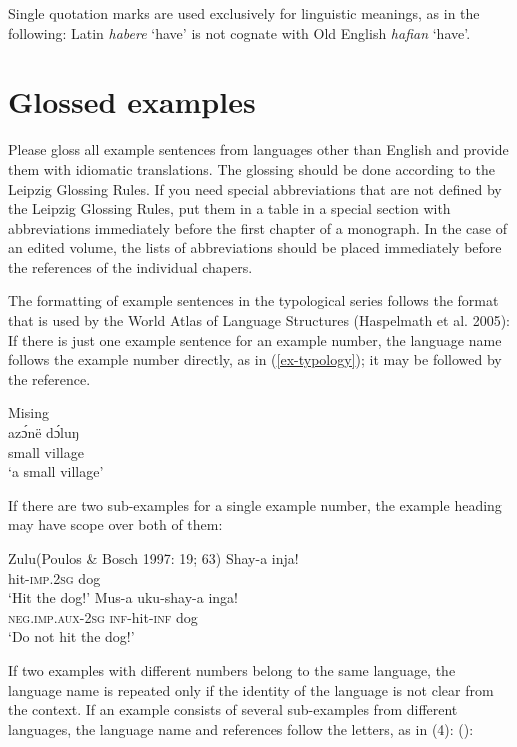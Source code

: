 \begin{enumerate}
\begin{enumerate}
\end{enumerate}


Single quotation marks are used exclusively for linguistic meanings, as in the following:
\ea
Latin \textit{habere} `have' is not cognate with Old English \textit{hafian} `have'.
\z

\section{Glossed examples}

Please gloss all example sentences from languages other than English and provide them with idiomatic translations. The glossing should be done according
to the Leipzig Glossing Rules. 
If you need special abbreviations that are not defined by the Leipzig Glossing Rules, put them in a table in a special section with abbreviations immediately before the first chapter of a monograph. In the case of an edited volume, the lists of abbreviations should be placed immediately before the references of the individual chapers.

The formatting of example sentences in the typological series follows the format that is used by the World Atlas of Language Structures (Haspelmath et al. 2005): If there is just one example sentence for an example number, the language name follows the example number directly, as in (\ref{ex-typology}); it may be followed by the reference.

{\def\exfont{\normalsize\itshape}
\ea\label{ex-typology}
{\rm Mising \citep[69]{Prasad91a}}\\
\gll azɔ́në dɔ́luŋ\\
     small village\\ 
\glt `a small village' 
\z


If there are two sub-examples for a single example number, the example heading may have scope over both of them:

\ea
{\rm Zulu}{(Poulos & Bosch 1997: 19; 63)}
\ea
\gll Shay-a		inja!\\
hit-\textsc{imp.2sg}	dog\\
\glt `Hit the dog!'
\ex
\gll	Mus-a	uku-shay-a	inga! \\
	\textsc{neg.imp.aux-2sg}	\textsc{inf}-hit-\textsc{inf}	dog \\
\glt		`Do not hit the dog!'	
\z
\z

If two examples with different numbers belong to the same language, the language name is repeated only if the identity of the language is not clear from the context. If an example consists of several sub-examples from different languages, the language name and references follow the letters, as in (4):
():

}
\end{enumerate}
